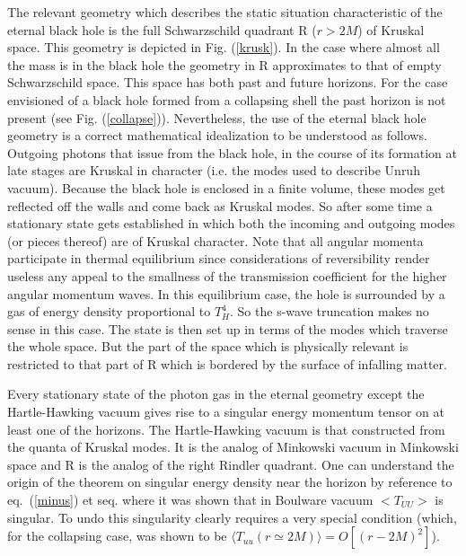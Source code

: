 \documentclass[12pt,oneside]{report}
\begin{document}
The relevant geometry which describes the static situation characteristic of 
the eternal black hole is the full Schwarzschild quadrant R ($r>2M$)
of Kruskal space.
This geometry is depicted in
Fig. (\ref{krusk}).
In the case
where almost all the mass is in the black hole the geometry in R
approximates to that of empty Schwarzschild space.
This space has both past and future horizons. For the case envisioned of
a black hole formed from a collapsing shell the past horizon is
not present (see Fig. (\ref{collapse})). Nevertheless, the 
use of the eternal black hole geometry is a 
correct mathematical idealization to be understood as follows. Outgoing photons
that issue from the black hole, in the course of its formation at late
stages are Kruskal in character (i.e. the modes used to describe Unruh
vacuum). Because the black hole is enclosed in a finite volume, these
modes get reflected off the walls and come back as Kruskal modes. So
after some time a stationary state gets established in which both the
incoming and outgoing modes (or pieces thereof) are of Kruskal character.
Note that all angular momenta participate in thermal equilibrium
since considerations of reversibility render useless any appeal to
the smallness of the transmission coefficient for the higher angular
momentum waves. In this equilibrium case, the hole is surrounded by a gas of
energy density proportional to $T_H^4$. So the s-wave truncation
makes no sense in this case.
The state is then set up in terms of the modes which traverse the whole
space. But the part of the space which is physically relevant is
restricted to that part of R which is bordered by the surface of
infalling matter.

Every stationary state of the photon gas in the eternal
geometry except the Hartle-Hawking
vacuum gives rise to a singular energy momentum tensor on at least one of
the horizons. The Hartle-Hawking vacuum  \cite{HaHa} is that constructed
from the quanta of Kruskal modes. It is the analog of Minkowski vacuum in
Minkowski space and R is the analog of the right Rindler quadrant.
One can understand the origin of the theorem on
singular energy density near the horizon by reference to eq.~(\ref{minus}) et seq.
where it was shown that in Boulware vacuum $ <T_{UU} > $ is
singular. To undo this singularity clearly requires a very
special condition (which, for the collapsing case, was shown to be
$ \langle T_{uu} (r\simeq 2M)\rangle = O [ ( r - 2 M)^2 ]$). 
\end{document}
